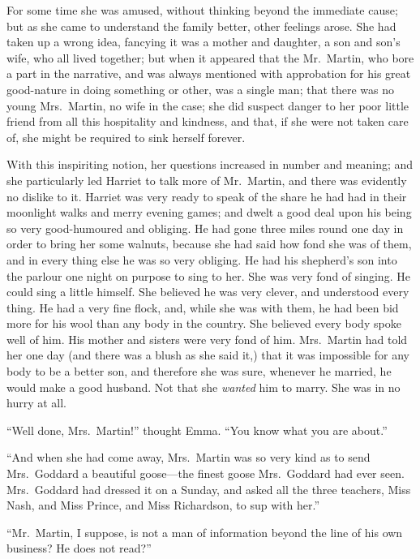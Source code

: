 For some time she was amused, without thinking beyond the immediate cause;
but as she came to understand the family better, other feelings arose.
She had taken up a wrong idea, fancying it was a mother and daughter,
a son and son's wife, who all lived together; but when it appeared
that the Mr.\ Martin, who bore a part in the narrative, and was always
mentioned with approbation for his great good-nature in doing something
or other, was a single man; that there was no young Mrs.\ Martin,
no wife in the case; she did suspect danger to her poor little
friend from all this hospitality and kindness, and that, if she
were not taken care of, she might be required to sink herself forever.

With this inspiriting notion, her questions increased in number
and meaning; and she particularly led Harriet to talk more of Mr.\ Martin,
and there was evidently no dislike to it.  Harriet was very ready
to speak of the share he had had in their moonlight walks and merry
evening games; and dwelt a good deal upon his being so very good-humoured
and obliging.  He had gone three miles round one day in order to bring
her some walnuts, because she had said how fond she was of them,
and in every thing else he was so very obliging.  He had his
shepherd's son into the parlour one night on purpose to sing to her.
She was very fond of singing.  He could sing a little himself.
She believed he was very clever, and understood every thing.
He had a very fine flock, and, while she was with them,
he had been bid more for his wool than any body in the country.
She believed every body spoke well of him.  His mother and sisters
were very fond of him.  Mrs.\ Martin had told her one day (and there
was a blush as she said it,) that it was impossible for any body
to be a better son, and therefore she was sure, whenever he married,
he would make a good husband.  Not that she \emph{wanted} him to marry.
She was in no hurry at all.

``Well done, Mrs.\ Martin!'' thought Emma.  ``You know what you are about.''

``And when she had come away, Mrs.\ Martin was so very kind as to send
Mrs.\ Goddard a beautiful goose---the finest goose Mrs.\ Goddard had
ever seen.  Mrs.\ Goddard had dressed it on a Sunday, and asked all
the three teachers, Miss Nash, and Miss Prince, and Miss Richardson,
to sup with her.''

``Mr.\ Martin, I suppose, is not a man of information beyond the line
of his own business? He does not read?''

